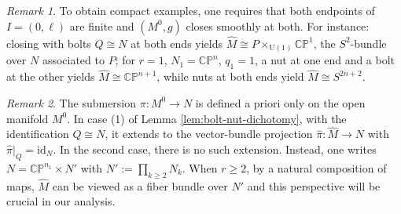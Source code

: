\documentclass[11pt]{amsart}
\theoremstyle{plain}
\numberwithin{equation}{section}
\theoremstyle{definition}
\theoremstyle{remark}
\newtheorem*{remarkx}{Remark}
\begin{document}
\begin{remarkx}To obtain compact examples, one requires that both endpoints of $I = (0, \ell)$ are finite and $(M^0, g)$ closes smoothly at both. For instance: closing with bolts $Q \cong N$ at both ends yields $\widehat{M} \cong P \times_{\mathrm{U}(1)} \mathbb{CP}^1$, the $S^2$-bundle over $N$ associated to $P$; for $r = 1$, $N_1 = \mathbb{CP}^n$, $q_1 = 1$, a nut at one end and a bolt at the other yields $\widehat{M} \cong \mathbb{CP}^{n+1}$, while nuts at both ends yield $\widehat{M} \cong S^{2n+2}$. %
\end{remarkx}
\begin{remarkx}%
	The submersion $\pi : M^0 \to N$ is defined a priori only on the open manifold $M^0$. In case (1) of Lemma \ref{lem:bolt-nut-dichotomy}, with the identification $Q \cong N$, it extends to the vector-bundle projection $\widehat{\pi} : \widehat{M} \to N$ with $\widehat{\pi}|_Q = \mathrm{id}_N$. In the second case, there is no such extension. Instead, one writes $N = \mathbb{CP}^{n_{1}} \times N'$ with $N' := \prod_{k \geq 2} N_k$. When $r \geq 2$, by a natural composition of maps, $\widehat{M}$ can be viewed as a fiber bundle over $N'$ and this perspective will be crucial in our analysis. 
\end{remarkx}
\iffalse	
\end{document}
